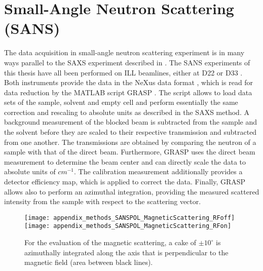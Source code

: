 \documentclass[\main/dresen_thesis.tex]{subfiles}
\begin{document}
  \section{Small-Angle Neutron Scattering (SANS)}
    \label{ch:methods:sans}
    The data acquisition in small-angle neutron scattering experiment is in many ways parallel to the SAXS experiment described in .
    The SANS experiments of this thesis have all been performed on ILL beamlines, either at D22  or D33 .
    Both instruments provide the data in the NeXus data format \cite{Koennecke_2015_Thene}, which is read for data reduction by the MATLAB script GRASP \cite{Dewhurst_2003_Grasp}.
    The script allows to load data sets of the sample, solvent and empty cell and perform essentially the same correction and rescaling to absolute units as described in the SAXS method.
    A background measurement of the blocked beam is subtracted from the sample and the solvent before they are scaled to their respective transmission and subtracted from one another.
    The transmissions are obtained by comparing the neutron of a sample with that of the direct beam.
    Furthermore, GRASP uses the direct beam measurement to determine the beam center and can directly scale the data to absolute units of $\unit{cm^{-1}}$.
    The calibration measurement additionally provides a detector efficiency map, which is applied to correct the data.
    Finally, GRASP allows also to perform an azimuthal integration, providing the measured scattered intensity from the sample with respect to the scattering vector.

    \begin{figure}[tb]
      \centering
      \texttt{[image: appendix\_methods\_SANSPOL\_MagneticScattering\_RFoff]}
      \texttt{[image: appendix\_methods\_SANSPOL\_MagneticScattering\_RFon]}
      \caption{\label{fig:methods:sans:sanspolData}For the evaluation of the magnetic scattering, a cake of $\pm 10^\circ$ is azimuthally integrated along the axis that is perpendicular to the magnetic field (area between black lines).}
    \end{figure}
\end{document}
